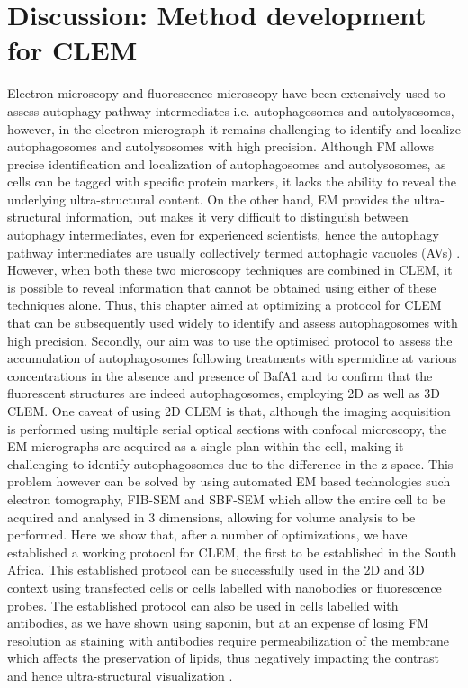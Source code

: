 \section{Discussion: Method development for CLEM}
Electron microscopy and fluorescence microscopy have been extensively used to assess autophagy pathway intermediates i.e. autophagosomes and autolysosomes, however, in the electron micrograph it remains challenging  to identify and localize autophagosomes and autolysosomes with high precision. Although FM allows precise identification and localization of autophagosomes and autolysosomes, as cells can be tagged with specific protein markers, it lacks the ability to reveal the underlying ultra-structural content. On the other hand, EM provides the ultra-structural information, but makes it very difficult to distinguish between autophagy intermediates, even for experienced scientists, hence the autophagy pathway intermediates are usually collectively termed autophagic vacuoles (AVs) \citep{Eskelinen2008,klionsky2016}. However, when both these two microscopy techniques are combined in CLEM, it is possible to reveal information that cannot be obtained using either of these techniques alone. Thus, this chapter aimed at optimizing a protocol for CLEM that can be subsequently used widely to identify and assess autophagosomes with high precision. Secondly, our aim was to use the optimised protocol to assess the accumulation of autophagosomes following treatments with spermidine at various concentrations in the absence and presence of BafA1 and to confirm that the fluorescent structures are indeed autophagosomes, employing 2D as well as 3D CLEM. One caveat of using 2D CLEM is that, although the imaging acquisition is performed using multiple serial optical sections with confocal microscopy, the EM micrographs are acquired as a single plan within the cell, making it challenging to identify autophagosomes due to the difference in the z space. This problem however can be solved by using automated EM based technologies such electron tomography, FIB-SEM and SBF-SEM \citep{Burel2018,Duke2014,Russell2017,Yla-Anttila2009} which allow the entire cell to be acquired and analysed in 3 dimensions, allowing for volume analysis to be performed. Here we show that, after a number of optimizations, we have established a working protocol for CLEM, the first to be established in the South Africa. This established protocol can be successfully used in the 2D and 3D context using transfected cells or cells labelled with nanobodies or fluorescence probes. The established protocol can also be used in cells labelled with antibodies, as we have shown using saponin, but at an expense of losing FM resolution as staining with antibodies require permeabilization of the membrane which affects the preservation of lipids, thus negatively impacting the contrast and hence ultra-structural visualization \citep{Eskelinen2008}.

